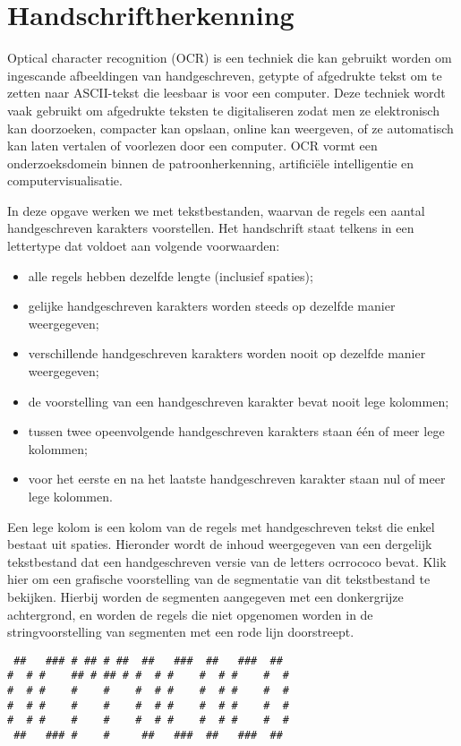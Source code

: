 
\section*{Handschriftherkenning}

Optical character recognition (OCR) is een techniek die kan gebruikt worden om
ingescande afbeeldingen van handgeschreven, getypte of afgedrukte tekst om te
zetten naar ASCII-tekst die leesbaar is voor een computer. Deze techniek wordt
vaak gebruikt om afgedrukte teksten te digitaliseren zodat men ze elektronisch
kan doorzoeken, compacter kan opslaan, online kan weergeven, of ze automatisch
kan laten vertalen of voorlezen door een computer. OCR vormt een
onderzoeksdomein binnen de patroonherkenning, artificiële intelligentie en
computervisualisatie.

In deze opgave werken we met tekstbestanden, waarvan de regels een aantal
handgeschreven karakters voorstellen. Het handschrift staat telkens in een
lettertype dat voldoet aan volgende voorwaarden:

\begin{itemize}
    \item alle regels hebben dezelfde lengte (inclusief spaties);
    \item gelijke handgeschreven karakters worden steeds op dezelfde manier
        weergegeven;
    \item verschillende handgeschreven karakters worden nooit op dezelfde manier
        weergegeven;
    \item de voorstelling van een handgeschreven karakter bevat nooit lege
        kolommen;
    \item tussen twee opeenvolgende handgeschreven karakters staan één of meer
        lege kolommen;
    \item voor het eerste en na het laatste handgeschreven karakter staan nul of
        meer lege kolommen.
\end{itemize}

Een lege kolom is een kolom van de regels met handgeschreven tekst die enkel
bestaat uit spaties. Hieronder wordt de inhoud weergegeven van een dergelijk
tekstbestand dat een handgeschreven versie van de letters ocrrococo bevat. Klik
hier om een grafische voorstelling van de segmentatie van dit tekstbestand te
bekijken. Hierbij worden de segmenten aangegeven met een donkergrijze
achtergrond, en worden de regels die niet opgenomen worden in de
stringvoorstelling van segmenten met een rode lijn doorstreept.

\begin{verbatim}
 ##   ### # ## # ##  ##   ###  ##   ###  ##  
#  # #    ## # ## # #  # #    #  # #    #  # 
#  # #    #    #    #  # #    #  # #    #  # 
#  # #    #    #    #  # #    #  # #    #  # 
#  # #    #    #    #  # #    #  # #    #  # 
 ##   ### #    #     ##   ###  ##   ###  ##  
\end{verbatim}

